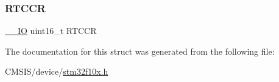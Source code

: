 \mbox{\label{struct_b_k_p___type_def_a285d36c479b3a885f8706dd0286ddd15}} 
\subsubsection{\texorpdfstring{RTCCR}{RTCCR}}
{\footnotesize\ttfamily \mbox{\hyperlink{core__sc300_8h_aec43007d9998a0a0e01faede4133d6be}{\+\_\+\+\_\+\+IO}} uint16\+\_\+t R\+T\+C\+CR}



The documentation for this struct was generated from the following file\+:\begin{DoxyCompactItemize}
\item 
C\+M\+S\+I\+S/device/\mbox{\hyperlink{stm32f10x_8h}{stm32f10x.\+h}}\end{DoxyCompactItemize}
